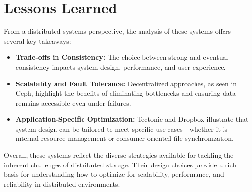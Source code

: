 \section{Lessons Learned}
From a distributed systems perspective, the analysis of these systems offers several key takeaways:
\begin{itemize}
    \item \textbf{Trade-offs in Consistency:} The choice between strong and eventual consistency impacts system design, performance, and user experience.
    \item \textbf{Scalability and Fault Tolerance:} Decentralized approaches, as seen in Ceph, highlight the benefits of eliminating bottlenecks and ensuring data remains accessible even under failures.
    \item \textbf{Application-Specific Optimization:} Tectonic and Dropbox illustrate that system design can be tailored to meet specific use cases—whether it is internal resource management or consumer-oriented file synchronization.
\end{itemize}
Overall, these systems reflect the diverse strategies available for tackling the inherent challenges of distributed storage. Their design choices provide a rich basis for understanding how to optimize for scalability, performance, and reliability in distributed environments.
